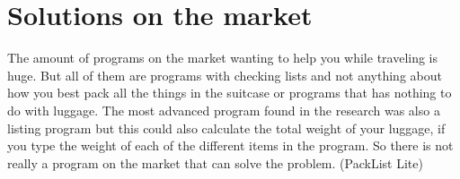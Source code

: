 \section{Solutions on the market}

The amount of programs on the market wanting to help you while traveling is huge. But all of them are programs with checking lists and not anything about how you best pack all the things in the suitcase or programs that has nothing to do with luggage. The most advanced program found in the research was also a listing program but this could also calculate the total weight of your luggage, if you type the weight of each of the different items in the program. So there is not really a program on the market that can solve the problem. (PackList Lite)